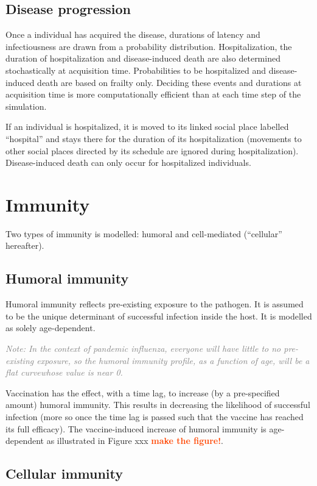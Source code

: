 \documentclass[11pt, onecolumn]{article}
\newcommand{\warning}[1]{\textbf{\textcolor{OrangeRed}{#1}}}
\newcommand{\note}[1]{\textit{\textcolor{Grey}{Note: #1}}}
\begin{document}
\subsection{Disease progression}

Once a individual has acquired the disease, durations of latency and infectiousness are drawn from a probability distribution. Hospitalization, the duration of hospitalization and disease-induced death are also determined stochastically at acquisition time.
Probabilities to be hospitalized and disease-induced death are based on frailty only.
Deciding these events and durations at acquisition time is more computationally efficient than at each time step of the simulation.

If an individual is hospitalized, it is moved to its linked social place labelled ``hospital'' and stays there for the duration of its hospitalization (movements to other social places directed by its schedule are ignored during hospitalization). Disease-induced death can only occur for hospitalized individuals.


\section{Immunity}

Two types of immunity is modelled: humoral and cell-mediated (``cellular'' hereafter). 

\subsection{Humoral immunity}	
Humoral immunity reflects pre-existing exposure to the pathogen. It is assumed to be the unique determinant of successful infection inside the host. It is modelled as solely age-dependent.
	
\note{In the context of pandemic influenza, everyone will have little to no pre-existing exposure, so the humoral immunity profile, as a function of age, will be a flat curvewhose value is near 0.}

Vaccination has the effect, with a time lag, to increase (by a pre-specified amount) humoral immunity. This results in decreasing the likelihood of successful infection (more so once the time lag is passed such that the vaccine has reached its full efficacy). The vaccine-induced increase of humoral immunity is age-dependent as illustrated in Figure xxx \warning{make the figure!}. 

\subsection{Cellular immunity}	
\end{document}
